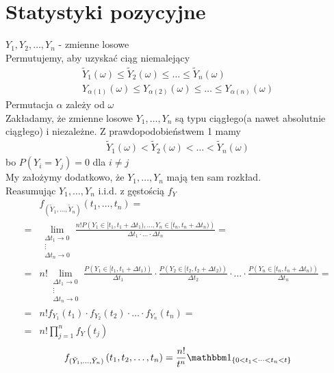 \section{Statystyki pozycyjne}
$ Y_1,Y_2,\dots,Y_n $ - zmienne losowe\\
Permutujemy, aby uzyskać ciąg niemalejący
\begin{gather*}
\tilde{Y}_1(\omega)\le\tilde{Y}_2(\omega)\le\dots\le\tilde{Y}_n(\omega)\\
{Y}_{\alpha(1)}(\omega)\le{Y}_{\alpha(2)}(\omega)\le\dots\le{Y}_{\alpha(n)}(\omega)
\end{gather*}
Permutacja $ \alpha $ zależy od $ \omega $\\
Zakładamy, że zmienne losowe $ Y_1,\dots,Y_n$ są typu ciągłego(a nawet absolutnie ciągłego) i niezależne. Z prawdopodobieństwem 1 mamy
\begin{gather*}
\tilde{Y}_1(\omega)<\tilde{Y}_2(\omega)<\dots<\tilde{Y}_n(\omega)
\end{gather*}
bo $ P\left(Y_i=Y_j\right)=0 $ dla $ i\neq j $\\
My założymy dodatkowo, że $ Y_1,\dots,Y_n$ mają ten sam rozkład.\\
Reasumując $ Y_1,\dots,Y_n$ i.i.d. z gęstością $ f_Y $
\begin{align*}
&f_{(\tilde{Y}_1,\dots,\tilde{Y}_n)}(t_1,\dots,t_n)
=\\=&
\lim\limits_{\substack{\Delta t_1\to0\\\vdots\\\Delta t_n\to0}}
\frac{n!P\left(Y_1\in[t_1,t_1+\Delta t_1),\dots,Y_n\in[t_n,t_n+\Delta t_n)\right)}{\Delta t_1\cdot\ldots\cdot\Delta t_n}
=\\=&
n!\lim\limits_{\substack{\Delta t_1\to0\\\vdots\\\Delta t_n\to0}}
\frac{P\left(Y_1\in[t_1,t_1+\Delta t_1)\right)}{\Delta t_1}\cdot
\frac{P\left(Y_2\in[t_2,t_2+\Delta t_2)\right)}{\Delta t_2}\cdot
\ldots\cdot
\frac{P\left(Y_n\in[t_n,t_n+\Delta t_n)\right)}{\Delta t_n}
=\\=&
n!f_{Y_1}(t_1)\cdot f_{Y_2}(t_2)\cdot \ldots \cdot f_{Y_n}(t_n)
=\\=&
n!\prod_{j=1}^{n}f_Y(t_j)
\end{align*}
\begin{gather*}
f_{(\tilde Y_1,\dots,\tilde Y_n)}\left(t_1,t_2,\ldots,t_n\right)
=
\frac{n!}{t^n}\mathbbm1_{\{0<t_1<\dots<t_n<t\}}
\end{gather*}
